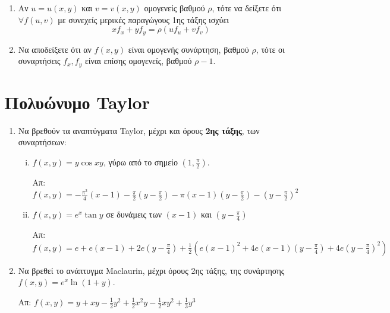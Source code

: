 \begin{enumerate}
  \item Αν $ u = u(x,y) $ και $ v=v(x,y) $ ομογενείς βαθμού $ \rho $, 
    τότε να δείξετε ότι $ \forall f(u,v) $ με συνεχείς μερικές παραγώγους 1ης τάξης
    ισχύει 
    \[
      xf_{x}+yf_{y}= \rho (u f_{u}+vf_{v}) 
    \] 
  \item Να αποδείξετε ότι αν $f(x,y)$ είναι ομογενής συνάρτηση, βαθμού $ \rho $, τότε 
    οι συναρτήσεις $ f_{x}, f_{y} $ είναι επίσης ομογενείς, βαθμού $ \rho -1 $.
\end{enumerate}


\section*{Πολυώνυμο Taylor}

\begin{enumerate}
  \item Να βρεθούν τα αναπτύγματα Taylor, μέχρι και όρους 
    \textbf{2ης τάξης}, των συναρτήσεων:

    \begin{enumerate}[i)]
      \item  $f(x,y)=y\cos{xy} $, γύρω από το σημείο 
        $ \left(1, \frac{ \pi }{ 2 }\right) $.

        \hfill Απ: $f(x,y)=-\frac{\pi^{2}}{4}(x-1) - \frac{ \pi }{ 2 } 
        \left(y - \frac{ \pi }{2 }\right) - \pi(x-1)
        \left(y-\frac{\pi}{2}\right)- \left(y- \frac{ \pi }{ 2} \right)^{2} $

      \item $ f(x,y)=e^{x}\tan{y} $ σε δυνάμεις των $ (x-1) $ και 
        $ \left(y - \frac{ \pi }{ 4 }\right) $

        \hfill Απ: $ f(x,y) = e + e(x-1) + 2e\left(y- \frac{ \pi }{ 4 }\right)
        + \frac{1}{ 2 } \left(e(x-1)^{2}+4e(x-1)\left(y- \frac{ \pi }{ 4 }
        \right) + 4e\left(y- \frac{ \pi }{ 4 } \right)^{2}\right) $
    \end{enumerate}

  \item Να βρεθεί το ανάπτυγμα Maclaurin, μέχρι όρους 2ης τάξης, 
    της συνάρτησης $ f(x,y) = e^{x}\ln(1+y)$.

    \hfill Απ: $ f(x,y)=y + xy - \frac{1}{ 2 } y^{2} + \frac{1}{ 2 } x^{2}y - 
    \frac{1}{ 2 } xy^{2} + \frac{1}{ 3 } y^{3} $
\end{enumerate}




